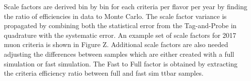 Scale factors are derived bin by bin for each criteria per flavor per year by finding the ratio of efficiencies in data to Monte Carlo. The scale factor variance is propagated by combining both the statistical error from the Tag-and-Probe in quadrature with the systematic error. An example set of scale factors for 2017 muon criteria is shown in Figure Z.  Additional scale factors are also  needed adjusting the differences between samples which are either created with a full simulation or fast simulation. The Fast to Full factor is obtained by extracting the criteria efficiency ratio between  full and fast sim ttbar samples.
